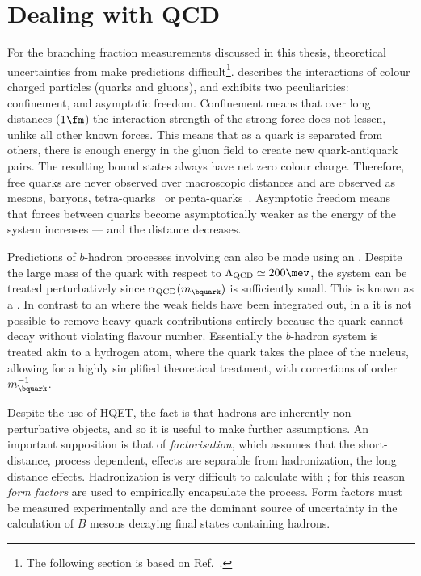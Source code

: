 \section{Dealing with QCD}

For the branching fraction measurements discussed in this thesis, theoretical uncertainties from \QCD make
predictions difficult\footnote{
  The following section is based on Ref.~\cite{Pich:1998xt}.
}.
\QCD describes the interactions of colour charged particles (quarks and
gluons),
and exhibits two peculiarities: confinement, and asymptotic freedom.
Confinement means that over long distances (\approx$1\fm$)
the interaction strength of the strong force does not lessen, unlike all other known
forces.
This means that as a quark is separated from others, there is enough energy in the gluon field to
create new quark-antiquark pairs.
The resulting bound states always have net zero colour charge.
Therefore, free quarks are never observed over macroscopic distances
and are observed as mesons, baryons, tetra-quarks~\cite{LHCb-PAPER-2014-014} or
penta-quarks~\cite{LHCb-PAPER-2015-029}.
Asymptotic freedom means that forces between quarks become asymptotically weaker as the energy of
the system increases --- and the distance decreases.

Predictions of $b$-hadron processes involving \QCD can also be made using an \EFT.
Despite the large mass of the \bquark quark with respect to $\Lambda_\mathrm{QCD}\simeq200\mev$,
the system can be treated perturbatively since $\alpha_\mathrm{QCD}(m_\bquark)$ is sufficiently
small.
This is known as a \HQET.
In contrast to an \EFT where the weak fields have been integrated out, in a \HQET
it is not possible to remove heavy quark contributions entirely because the \bquark quark
cannot decay without violating flavour number.
Essentially the $b$-hadron system is treated akin to a hydrogen atom, where the \bquark quark takes
the place of the nucleus, allowing for a highly simplified theoretical treatment, with corrections
of order $m_\bquark^{-1}$.

Despite the use of \gls{HQET}, the fact is that hadrons are inherently non-perturbative objects,
and so it is useful to make further assumptions.
An important supposition is that of \emph{factorisation}, which assumes that the short-distance,
process dependent, \QCD effects are separable from hadronization, the long distance effects.
Hadronization is very difficult to calculate with \QCD; for this reason \emph{form factors} are
used to empirically encapsulate the process.
Form factors must be measured experimentally and are the dominant source of uncertainty in the
calculation of $B$ mesons decaying  final states containing hadrons.





